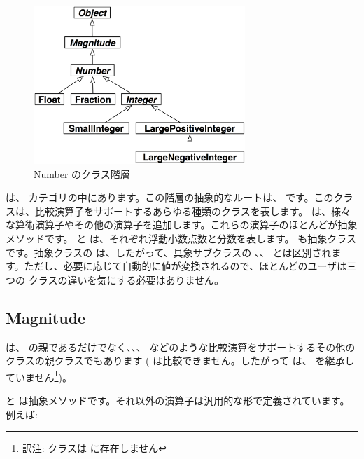 \documentclass[a4paper,10pt,twoside]{book}
\begin{document}
\begin{figure}[ht]
\centerline {\includegraphics[width=8cm]{NumberHierarchy}}
\caption{Number のクラス階層 }
\end{figure}

 は、 カテゴリの中にあります。この階層の抽象的なルートは、 です。このクラスは、比較演算子をサポートするあらゆる種類のクラスを表します。 は、様々な算術演算子やその他の演算子を追加します。これらの演算子のほとんどが抽象メソッドです。 と  は、それぞれ浮動小数点数と分数を表します。 も抽象クラスです。抽象クラスの  は、したがって、具象サブクラスの 、、 とは区別されます。ただし、必要に応じて自動的に値が変換されるので、ほとんどのユーザは三つの  クラスの違いを気にする必要はありません。%

\subsection{Magnitude}

 は、 の親であるだけでなく、、、 などのような比較演算をサポートするその他のクラスの親クラスでもあります ( は比較できません。したがって  は、 を継承していません\footnote{訳注:  クラスは  に存在しません})。

 と  は抽象メソッドです。それ以外の演算子は汎用的な形で定義されています。例えば:
\end{document}
